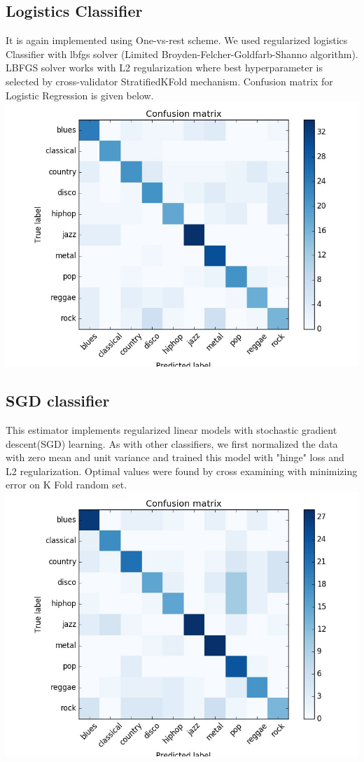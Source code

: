 \documentclass[conference]{IEEEtran}
\begin{document}
\subsection{Logistics Classifier}
\label{sec:Logistics Classifier}
It is again implemented using One-vs-rest scheme. We used regularized logistics Classifier with lbfgs solver (Limited Broyden-Felcher-Goldfarb-Shanno algorithm). LBFGS solver works with L2 regularization where best hyperparameter is selected by cross-validator StratifiedKFold mechanism.
Confusion matrix for Logistic Regression is given below.
\includegraphics[width=\columnwidth]{LOGISTIC}


\subsection{SGD classifier}
\label{sub:SGD classifier}
This estimator implements regularized linear models with stochastic gradient descent(SGD) learning. As with other classifiers, we first normalized the data with zero mean and unit variance and trained this model with "hinge" loss and L2 regularization. Optimal values were found by cross examining with minimizing error on K Fold random set.
\includegraphics[width=\columnwidth]{SGDCLASSIFIER}
\end{document}
